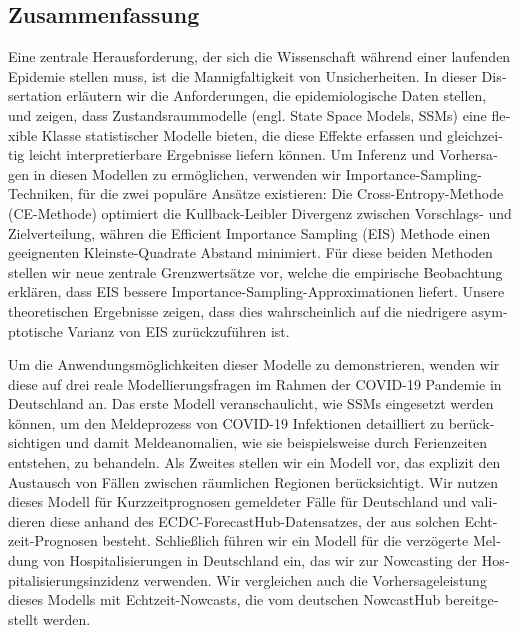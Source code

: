 \begin{otherlanguage}{ngerman}
\chapter*{Zusammenfassung}
Eine zentrale Herausforderung, der sich die Wissenschaft während einer laufenden Epidemie stellen muss, ist die Mannigfaltigkeit von Unsicherheiten. In dieser Dissertation erläutern wir die Anforderungen, die epidemiologische Daten stellen, und zeigen, dass Zustandsraummodelle (engl. State Space Models, SSMs) eine flexible Klasse statistischer Modelle bieten, die diese Effekte erfassen und gleichzeitig leicht interpretierbare Ergebnisse liefern können.
Um Inferenz und Vorhersagen in diesen Modellen zu ermöglichen, verwenden wir Importance-Sampling-Techniken, für die zwei populäre Ansätze existieren: Die Cross-Entropy-Methode (CE-Methode) optimiert die Kullback-Leibler Divergenz zwischen Vorschlags- und Zielverteilung, währen die Efficient Importance Sampling (EIS) Methode einen geeignenten Kleinste-Quadrate Abstand minimiert.
Für diese beiden Methoden stellen wir neue zentrale Grenzwertsätze vor, welche die empirische Beobachtung erklären, dass EIS bessere Importance-Sampling-Approximationen liefert. Unsere theoretischen Ergebnisse zeigen, dass dies wahrscheinlich auf die niedrigere asymptotische Varianz von EIS zurückzuführen ist.

Um die Anwendungsmöglichkeiten dieser Modelle zu demonstrieren, wenden wir diese auf drei reale Modellierungsfragen im Rahmen der COVID-19 Pandemie in Deutschland an.
Das erste Modell veranschaulicht, wie SSMs eingesetzt werden können, um den Meldeprozess von COVID-19 Infektionen detailliert zu berücksichtigen und damit Meldeanomalien, wie sie beispielsweise durch Ferienzeiten entstehen, zu behandeln.
Als Zweites stellen wir ein Modell vor, das explizit den Austausch von Fällen zwischen räumlichen Regionen berücksichtigt. Wir nutzen dieses Modell für Kurzzeitprognosen gemeldeter Fälle für Deutschland und validieren diese anhand des ECDC-ForecastHub-Datensatzes, der aus solchen Echtzeit-Prognosen besteht.
Schließlich führen wir ein Modell für die verzögerte Meldung von Hospitalisierungen in Deutschland ein, das wir zur Nowcasting der Hospitalisierungsinzidenz verwenden. Wir vergleichen auch die Vorhersageleistung dieses Modells mit Echtzeit-Nowcasts, die vom deutschen NowcastHub bereitgestellt werden.
\end{otherlanguage}

\endgroup

\vfill